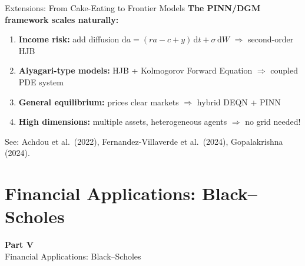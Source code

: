 \documentclass[aspectratio=169,11pt]{beamer}
\begin{document}
\begin{frame}{Extensions: From Cake-Eating to Frontier Models}
\textbf{The PINN/DGM framework scales naturally:}

\vspace{0.3em}
\begin{enumerate}
    \item \textbf{Income risk:} add diffusion $\mathrm{d}a = (ra - c + y)\,\mathrm{d}t + \sigma\,\mathrm{d}W$
    \quad$\Rightarrow$ second-order HJB

    \vspace{0.2em}
    \item \textbf{Aiyagari-type models:} HJB + Kolmogorov Forward Equation
    \quad$\Rightarrow$ coupled PDE system

    \vspace{0.2em}
    \item \textbf{General equilibrium:} prices clear markets
    \quad$\Rightarrow$ hybrid DEQN + PINN

    \vspace{0.2em}
    \item \textbf{High dimensions:} multiple assets, heterogeneous agents
    \quad$\Rightarrow$ no grid needed!
\end{enumerate}

\vspace{0.3em}
{\small See: Achdou et al.\ (2022), Fernandez-Villaverde et al.\ (2024), Gopalakrishna (2024).}
\end{frame}


\section{Financial Applications: Black--Scholes}

\begin{frame}{}
\vfill
\begin{center}
{\Huge \textcolor{uzhblue}{\textbf{Part V}}}\\[12pt]
{\LARGE Financial Applications: Black--Scholes}
\end{center}
\vfill
\end{frame}
\end{document}
